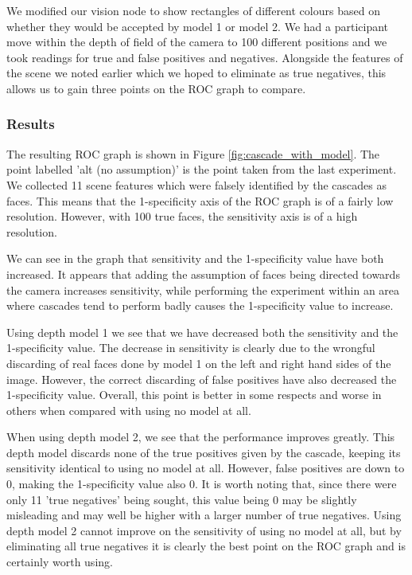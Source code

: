 \documentclass[conference]{IEEEtran}
\begin{document}
We modified our vision node to show rectangles of different colours based on whether they would be accepted by model 1 or model 2. We had a participant move within the depth of field of the camera to 100 different positions and we took readings for true and false positives and negatives. Alongside the features of the scene we noted earlier which we hoped to eliminate as true negatives, this allows us to gain three points on the ROC graph to compare.
\subsubsection{Results}
The resulting ROC graph is shown in Figure \ref{fig:cascade_with_model}. The point labelled 'alt (no assumption)' is the point taken from the last experiment. We collected 11 scene features which were falsely identified by the cascades as faces. This means that the 1-specificity axis of the ROC graph is of a fairly low resolution. However, with 100 true faces, the sensitivity axis is of a high resolution.

We can see in the graph that sensitivity and the 1-specificity value have both increased. It appears that adding the assumption of faces being directed towards the camera increases sensitivity, while performing the experiment within an area where cascades tend to perform badly causes the 1-specificity value to increase.

Using depth model 1 we see that we have decreased both the sensitivity and the 1-specificity value. The decrease in sensitivity is clearly due to the wrongful discarding of real faces done by model 1 on the left and right hand sides of the image. However, the correct discarding of false positives have also decreased the 1-specificity value. Overall, this point is better in some respects and worse in others when compared with using no model at all.

When using depth model 2, we see that the performance improves greatly. This depth model discards none of the true positives given by the cascade, keeping its sensitivity identical to using no model at all. However, false positives are down to 0, making the 1-specificity value also 0. It is worth noting that, since there were only 11 'true negatives' being sought, this value being 0 may be slightly misleading and may well be higher with a larger number of true negatives. Using depth model 2 cannot improve on the sensitivity of using no model at all, but by eliminating all true negatives it is clearly the best point on the ROC graph and is certainly worth using.
\end{document}
